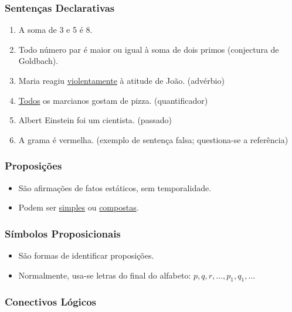         \subsubsection*{Sentenças Declarativas}
        \begin{enumerate}[left=0.5cm, align=left, nosep]
            \item A soma de 3 e 5 é 8.
            \item Todo número par é maior ou igual à soma de dois primos (conjectura de Goldbach).
            \item Maria reagiu \underline{violentamente} à atitude de João. (advérbio)
            \item \underline{Todos} os marcianos gostam de pizza. (quantificador)
            \item Albert Einstein foi um cientista. (passado)
            \item A grama é vermelha. (exemplo de sentença falsa; questiona-se a referência)
        \end{enumerate}

        \subsubsection*{Proposições}
            \begin{itemize}[left=0.5cm, align=left, nosep]
                \item São afirmações de fatos estáticos, sem temporalidade.
                \item Podem ser \underline{simples} ou \underline{compostas}.
            \end{itemize}

        \subsubsection*{Símbolos Proposicionais}
            \begin{itemize}[left=0.5cm, align=left, nosep]
                \item São formas de identificar proposições.
                \item Normalmente, usa-se letras do final do alfabeto: \(p, q, r, \ldots, p_1, q_1, \ldots\)
            \end{itemize}

        \subsubsection*{Conectivos Lógicos}

